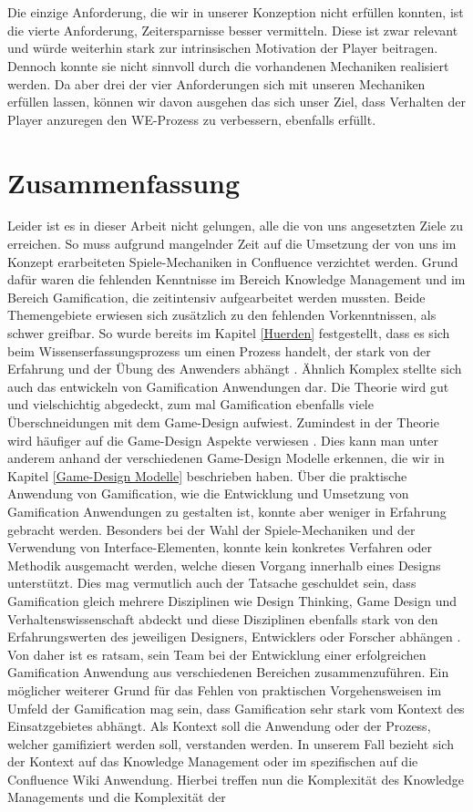 \documentclass[a4paper,12pt,twoside]{scrartcl}
\begin{document}
\\\\
Die einzige Anforderung, die wir in unserer Konzeption nicht erfüllen konnten, ist die vierte Anforderung, Zeitersparnisse besser vermitteln. Diese ist zwar relevant und würde weiterhin stark zur intrinsischen Motivation der Player beitragen. Dennoch konnte sie nicht sinnvoll durch die vorhandenen Mechaniken realisiert werden. Da aber drei der vier Anforderungen sich mit unseren Mechaniken erfüllen lassen, können wir davon ausgehen das sich unser Ziel, dass Verhalten der Player anzuregen den WE-Prozess zu verbessern, ebenfalls erfüllt.
\newpage
\section{Zusammenfassung}
Leider ist es in dieser Arbeit nicht gelungen, alle die von uns angesetzten Ziele zu erreichen. So muss aufgrund mangelnder Zeit auf die Umsetzung der von uns im Konzept erarbeiteten Spiele-Mechaniken in Confluence verzichtet werden. Grund dafür waren die fehlenden Kenntnisse im Bereich Knowledge Management und im Bereich Gamification, die zeitintensiv aufgearbeitet werden mussten. Beide Themengebiete erwiesen sich zusätzlich zu den fehlenden Vorkenntnissen, als schwer greifbar. So wurde bereits im Kapitel \ref{Huerden} festgestellt, dass es sich beim Wissenserfassungsprozess um einen Prozess handelt, der stark von der Erfahrung und der Übung des Anwenders abhängt \cite{At2005}. Ähnlich Komplex stellte sich auch das entwickeln von Gamification Anwendungen dar. Die Theorie wird gut und vielschichtig abgedeckt, zum mal Gamification ebenfalls viele Überschneidungen mit dem Game-Design aufwiest. Zumindest in der Theorie wird häufiger auf die Game-Design Aspekte verwiesen \cite{Deterding2011}. Dies kann man unter anderem anhand der verschiedenen Game-Design Modelle erkennen, die wir in Kapitel \ref{Game-Design Modelle} beschrieben haben. Über die praktische Anwendung von Gamification, wie die Entwicklung und Umsetzung von Gamification Anwendungen zu gestalten ist, konnte aber weniger in Erfahrung gebracht werden. Besonders bei der Wahl der Spiele-Mechaniken und der Verwendung von Interface-Elementen, konnte kein konkretes Verfahren oder Methodik ausgemacht werden, welche diesen Vorgang innerhalb eines Designs unterstützt. Dies mag vermutlich auch der Tatsache geschuldet sein, dass Gamification gleich mehrere Disziplinen wie Design Thinking, Game Design und Verhaltenswissenschaft abdeckt und diese Disziplinen ebenfalls stark von den Erfahrungswerten des jeweiligen Designers, Entwicklers oder Forscher abhängen \cite{gamificationDefinition}. Von daher ist es ratsam, sein Team bei der Entwicklung einer erfolgreichen Gamification Anwendung aus verschiedenen Bereichen zusammenzuführen. Ein möglicher weiterer Grund für das Fehlen von praktischen Vorgehensweisen im Umfeld der Gamification mag sein, dass Gamification sehr stark vom Kontext des Einsatzgebietes abhängt. Als Kontext soll die Anwendung oder der Prozess, welcher gamifiziert werden soll, verstanden werden. In unserem Fall bezieht sich der Kontext auf das Knowledge Management oder im spezifischen auf die Confluence Wiki Anwendung. Hierbei treffen nun die Komplexität des Knowledge Managements und die Komplexität der 
\end{document}

